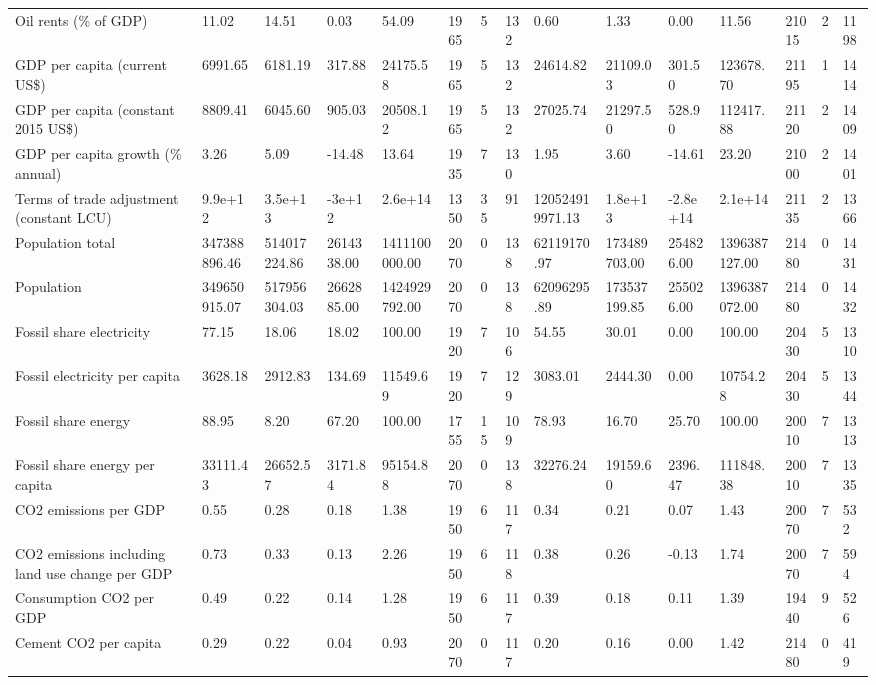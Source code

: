\begin{longtable}{lllllllllllllll}
Oil rents (\% of GDP) & 11.02 & 14.51 & 0.03 & 54.09 & 1965 & 5 & 132 & 0.60 & 1.33 & 0.00 & 11.56 & 21015 & 2 & 1198\\
GDP per capita (current US\$) & 6991.65 & 6181.19 & 317.88 & 24175.58 & 1965 & 5 & 132 & 24614.82 & 21109.03 & 301.50 & 123678.70 & 21195 & 1 & 1414\\
GDP per capita (constant 2015 US\$) & 8809.41 & 6045.60 & 905.03 & 20508.12 & 1965 & 5 & 132 & 27025.74 & 21297.50 & 528.90 & 112417.88 & 21120 & 2 & 1409\\
\addlinespace
GDP per capita growth (\% annual) & 3.26 & 5.09 & -14.48 & 13.64 & 1935 & 7 & 130 & 1.95 & 3.60 & -14.61 & 23.20 & 21000 & 2 & 1401\\
Terms of trade adjustment (constant LCU) & 9.9e+12 & 3.5e+13 & -3e+12 & 2.6e+14 & 1350 & 35 & 91 & 120524919971.13 & 1.8e+13 & -2.8e+14 & 2.1e+14 & 21135 & 2 & 1366\\
Population total & 347388896.46 & 514017224.86 & 2614338.00 & 1411100000.00 & 2070 & 0 & 138 & 62119170.97 & 173489703.00 & 254826.00 & 1396387127.00 & 21480 & 0 & 1431\\
Population & 349650915.07 & 517956304.03 & 2662885.00 & 1424929792.00 & 2070 & 0 & 138 & 62096295.89 & 173537199.85 & 255026.00 & 1396387072.00 & 21480 & 0 & 1432\\
Fossil share electricity & 77.15 & 18.06 & 18.02 & 100.00 & 1920 & 7 & 106 & 54.55 & 30.01 & 0.00 & 100.00 & 20430 & 5 & 1310\\
\addlinespace
Fossil electricity per capita & 3628.18 & 2912.83 & 134.69 & 11549.69 & 1920 & 7 & 129 & 3083.01 & 2444.30 & 0.00 & 10754.28 & 20430 & 5 & 1344\\
Fossil share energy & 88.95 & 8.20 & 67.20 & 100.00 & 1755 & 15 & 109 & 78.93 & 16.70 & 25.70 & 100.00 & 20010 & 7 & 1313\\
Fossil share energy per capita & 33111.43 & 26652.57 & 3171.84 & 95154.88 & 2070 & 0 & 138 & 32276.24 & 19159.60 & 2396.47 & 111848.38 & 20010 & 7 & 1335\\
CO2 emissions per GDP & 0.55 & 0.28 & 0.18 & 1.38 & 1950 & 6 & 117 & 0.34 & 0.21 & 0.07 & 1.43 & 20070 & 7 & 532\\
CO2 emissions including land use change per GDP & 0.73 & 0.33 & 0.13 & 2.26 & 1950 & 6 & 118 & 0.38 & 0.26 & -0.13 & 1.74 & 20070 & 7 & 594\\
\addlinespace
Consumption CO2 per GDP & 0.49 & 0.22 & 0.14 & 1.28 & 1950 & 6 & 117 & 0.39 & 0.18 & 0.11 & 1.39 & 19440 & 9 & 526\\
Cement CO2 per capita & 0.29 & 0.22 & 0.04 & 0.93 & 2070 & 0 & 117 & 0.20 & 0.16 & 0.00 & 1.42 & 21480 & 0 & 419\\

\end{longtable}

